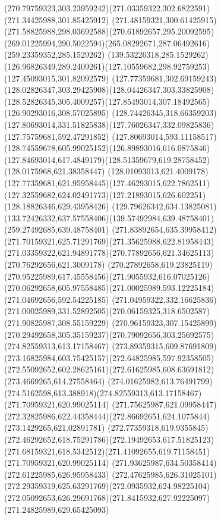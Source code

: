{{	\curveto(270.79759323,303.23959242)(271.03359322,302.6822591)(271.34425988,301.85425912)
	\curveto(271.48159321,300.61425915)(271.58825988,298.03692588)(270.61892657,295.20092595)
	\curveto(269.01225994,290.5022594)(265.08292671,287.06492616)(259.23359352,285.1529262)
	\lineto(139.53226318,285.1529262)
	\curveto(126.96826349,289.2409261)(127.10559682,298.92759253)(127.45093015,301.82092579)
	\curveto(127.77359681,302.69159243)(128.02826347,303.29425908)(128.04426347,303.33825908)
	\curveto(128.52826345,305.4009257)(127.85493014,307.18492565)(126.90293016,308.57025895)
	\curveto(128.74426345,318.66359203)(127.80693014,331.51825838)(127.76026347,332.09825836)
	\lineto(127.75759681,592.47291852)
	\curveto(127.80693014,593.11158517)(128.74559678,605.99025152)(126.89893016,616.0875846)
	\curveto(127.84693014,617.4849179)(128.51359679,619.28758452)(128.0175968,621.38358447)
	\curveto(128.01093013,621.4009178)(127.77359681,621.95958445)(127.46293015,622.7862511)
	\curveto(127.32559682,624.02491773)(127.21893015,626.602251)(128.18826346,629.43958426)
	\curveto(129.79626342,634.13825081)(133.72426332,637.57558406)(139.57492984,639.48758401)
	\lineto(259.27492685,639.48758401)
	\curveto(271.83892654,635.39958412)(271.70159321,625.71291769)(271.35625988,622.81958443)
	\curveto(271.03359322,621.94891778)(270.77892656,621.34625113)(270.76292656,621.3009178)
	\curveto(270.27892658,619.23825119)(270.95225989,617.45558456)(271.9055932,616.07025126)
	\curveto(270.06292658,605.97558485)(271.00025989,593.12225184)(271.04692656,592.54225185)
	\lineto(271.04959322,332.16625836)
	\curveto(271.00025989,331.52892505)(270.06159325,318.6502587)(271.90825987,308.55159229)
	\curveto(270.96159323,307.15425899)(270.29492658,305.35159237)(270.79092656,303.25692575)
	\moveto(274.82559313,613.17158467)
	\curveto(273.89359315,609.87691809)(273.16825984,603.75425157)(272.64825985,597.92358505)
	\curveto(272.55092652,602.28625161)(272.61625985,608.63691812)(273.4669265,614.27558464)
	\curveto(274.01625982,613.76491799)(274.5162598,613.388918)(274.82559313,613.17158467)
	\moveto(271.70959321,620.99025114)
	\curveto(271.75625987,621.09958447)(272.32825986,622.44358444)(272.86692651,624.1075844)
	\lineto(273.1429265,621.02891781)
	\curveto(272.77359318,619.9355845)(272.46292652,618.75291786)(272.19492653,617.51825123)
	\curveto(271.68159321,618.5342512)(271.41092655,619.71158451)(271.70959321,620.99025114)
	\moveto(271.93625987,634.50358414)
	\lineto(272.61225985,626.95958433)
	\curveto(272.47625985,626.31025101)(272.29359319,625.63291769)(272.0935932,624.98225104)
	\curveto(272.05092653,626.29691768)(271.8415932,627.92225097)(271.24825989,629.65425093)
}}

